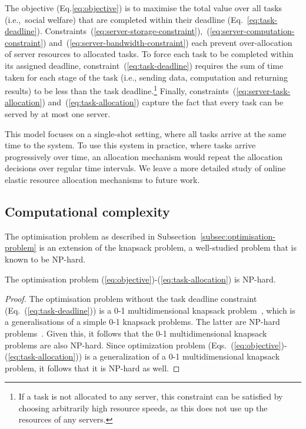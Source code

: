 The objective (Eq.\ref{eq:objective}) is to maximise the total value over all tasks (i.e.,\ social welfare) that are completed within their deadline (Eq.~\eqref{eq:task-deadline}). Constraints~(\ref{eq:server-storage-constraint}),~(\ref{eq:server-computation-constraint}) and~(\ref{eq:server-bandwidth-constraint}) each prevent over-allocation of server resources to allocated tasks. To force each task to be completed within its assigned deadline, constraint~(\ref{eq:task-deadline}) requires the sum of time taken for each stage of the task (i.e., sending data, computation and returning results) to be less than the task deadline.\footnote{If a task is not allocated to any server, this constraint can be satisfied by choosing arbitrarily high resource speeds, as this does not use up the resources of any servers.} Finally, constraints~(\ref{eq:server-task-allocation}) and~(\ref{eq:task-allocation}) capture the fact that every task can be served by at most one server.

This model focuses on a single-shot setting, where all tasks arrive at the same time to the system. To use this system in practice, where tasks arrive progressively over time, an allocation mechanism would repeat the allocation decisions over regular time intervals. We leave a more detailed study of online elastic resource allocation mechanisms to future work.

\subsection{Computational complexity}
\label{subsec:time-complexity}
The optimisation problem as described in Subsection~\ref{subsec:optimisation-problem} is an extension of the knapsack problem, a well-studied problem that is known to be NP-hard.

\begin{theorem}
     The optimisation problem (\ref{eq:objective})-(\ref{eq:task-allocation}) is NP-hard.
\end{theorem}
\begin{proof}
    The optimisation problem without the task deadline constraint (Eq.~(\ref{eq:task-deadline})) is a 0-1 multidimensional knapsack problem~\cite{knapsackproblems_2004}, which is a  generalisations of a simple 0-1 knapsack problems. The latter are NP-hard  problems~\cite{knapsackproblems_2004}. Given this, it follows that the 0-1 multidimensional knapsack problems are also NP-hard. Since optimization problem  (Eqs.~(\ref{eq:objective})-(\ref{eq:task-allocation})) is a generalization of a 0-1 multidimensional knapsack problem, it follows that it is NP-hard as well. 
\end{proof}

